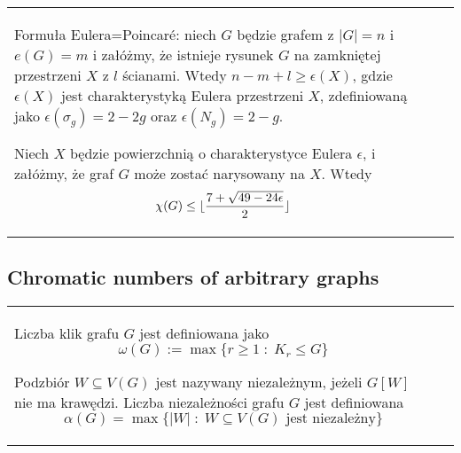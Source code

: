 \medskip

\begin{tabularx}{\textwidth}{ X!{\color{git90gray}\vrule} X}
{\color{def}Formuła Eulera=Poincar\'e}: niech $G$ będzie grafem z $|G|=n$ i $e(G)=m$ i załóżmy, że istnieje rysunek $G$ na zamkniętej przestrzeni $X$ z $l$ ścianami. Wtedy $n-m+l\geq\epsilon(X)$, gdzie $\epsilon(X)$ jest charakterystyką Eulera przestrzeni $X$, zdefiniowaną jako $\epsilon(\sigma_g)=2-2g$ oraz $\epsilon(N_g)=2-g$.
\medskip

Niech $X$ będzie powierzchnią o charakterystyce Eulera $\epsilon$, i załóżmy, że graf $G$ może zostać narysowany na $X$. Wtedy 
$$\chi(G)\leq\lfloor{7+\sqrt{49-24\epsilon}\over2}\rfloor$$
\end{tabularx}

\subsection{Chromatic numbers of arbitrary graphs}

\begin{tabularx}{\textwidth}{ X!{\color{git90gray}\vrule} X}
{\color{def}Liczba klik} grafu $G$ jest definiowana jako
$$\omega(G):=\max\{r\geq1\;:\; K_r\leq G\}$$

Podzbiór $W\subseteq V(G)$ jest nazywany {\color{def}niezależnym}, jeżeli $G[W]$ nie ma krawędzi. {\color{def}Liczba niezależności} grafu $G$ jest definiowana
$$\alpha(G)=\max\{|W|\;:\;W\subseteq V(G)\text{ jest niezależny}\}$$

\end{tabularx}